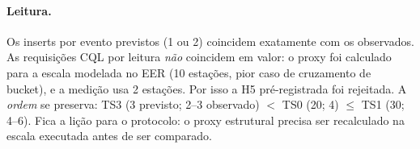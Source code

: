 \paragraph{Leitura.} Os inserts por evento previstos (1 ou 2) coincidem exatamente com os observados. As requisições CQL por leitura \emph{não} coincidem em valor: o proxy foi calculado para a escala modelada no EER (10 estações, pior caso de cruzamento de bucket), e a medição usa 2 estações. Por isso a H5 pré-registrada foi rejeitada. A \emph{ordem} se preserva: TS3 (3 previsto; 2--3 observado) $<$ TS0 (20; 4) $\le$ TS1 (30; 4--6). Fica a lição para o protocolo: o proxy estrutural precisa ser recalculado na escala executada antes de ser comparado.
